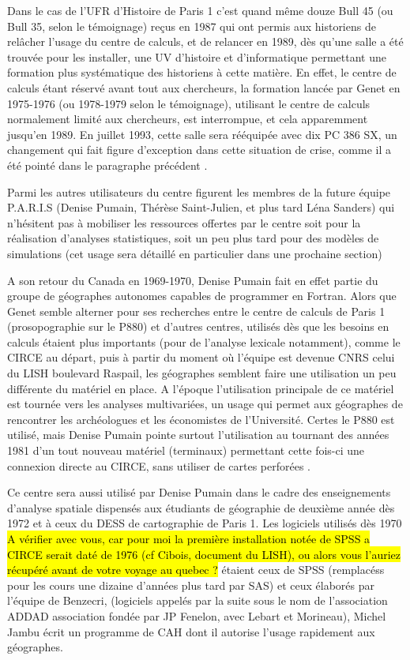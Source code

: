Dans le cas de l'UFR d'Histoire de Paris 1 c'est quand même douze Bull 45 (ou Bull 35, selon le témoignage) reçus en 1987 qui ont permis aux historiens de relâcher l'usage du centre de calculs, et de relancer en 1989, dès qu'une salle a été trouvée pour les installer, une UV d'histoire et d'informatique permettant une formation plus systématique des historiens à cette matière. En effet, le centre de calculs étant réservé avant tout aux chercheurs, la formation lancée par Genet en 1975-1976 (ou 1978-1979 selon le témoignage), utilisant le centre de calculs normalement limité aux chercheurs, est interrompue, et cela apparemment jusqu'en 1989. En juillet 1993, cette salle sera rééquipée avec dix PC 386 SX, un changement qui fait figure d'exception dans cette situation de crise, comme il a été pointé dans le paragraphe précédent \autocite{Genet1993}.

Parmi les autres utilisateurs du centre figurent les membres de la future équipe P.A.R.I.S (Denise Pumain, Thérèse Saint-Julien, et plus tard Léna Sanders) qui n'hésitent pas à mobiliser les ressources offertes par le centre soit pour la réalisation d'analyses statistiques, soit un peu plus tard pour des modèles de simulations (cet usage sera détaillé en particulier dans une prochaine section)

A son retour du Canada en 1969-1970, Denise Pumain fait en effet partie du groupe de géographes autonomes capables de programmer en Fortran. Alors que Genet semble alterner pour ses recherches entre le centre de calculs de Paris 1 (prosopographie sur le P880) et d'autres centres, utilisés dès que les besoins en calculs étaient plus importants (pour de l'analyse lexicale notamment), comme le CIRCE au départ, puis à partir du moment où l'équipe est devenue CNRS celui du LISH boulevard Raspail, les géographes semblent faire une utilisation un peu différente du matériel en place. A l'époque l'utilisation principale de ce matériel est tournée vers les analyses multivariées, un usage qui permet aux géographes de rencontrer les archéologues et les économistes de l'Université. Certes le P880 est utilisé, mais Denise Pumain pointe surtout l'utilisation au tournant des années 1981 d'un tout nouveau matériel (terminaux) permettant cette fois-ci une connexion directe au CIRCE, sans utiliser de cartes perforées .

Ce centre sera aussi utilisé par Denise Pumain dans le cadre des enseignements d'analyse spatiale dispensés aux étudiants de géographie de deuxième année dès 1972 et à ceux du DESS de cartographie de Paris 1. Les logiciels utilisés dès 1970 \hl{A vérifier avec vous, car pour moi la première installation notée de SPSS a CIRCE serait daté de 1976 (cf Cibois, document du LISH), ou alors vous l'auriez récupéré avant de votre voyage au quebec ?} étaient ceux de SPSS (remplacéss pour les cours une dizaine d'années plus tard par SAS) et ceux élaborés par l'équipe de Benzecri, (logiciels appelés par la suite sous le nom de l'association ADDAD association fondée par JP Fenelon, avec Lebart et Morineau), Michel Jambu écrit un programme de CAH dont il autorise l'usage rapidement aux géographes.

